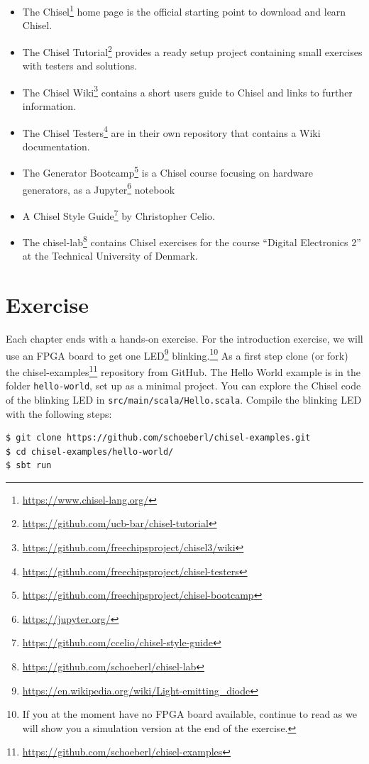 \documentclass[%
    10pt,
    headinclude, footexclude,
    openright, %
    notitlepage,
    cleardoubleempty,
    headsepline,
    pointlessnumbers,
    bibtotoc, idxtotoc,
    ]{scrbook}
\newcommand{\code}[1]{{\small{\texttt{#1}}}}
\newcommand{\myref}[2]{\href{#1}{#2}}
\renewcommand{\myref}[2]{{#2}{\footnote{\url{#1}}}}
\begin{document}
\begin{itemize}
\item The \myref{https://www.chisel-lang.org/}{Chisel} home page is the official starting point to
download and learn Chisel.
\item The \myref{https://github.com/ucb-bar/chisel-tutorial}{Chisel Tutorial} provides a ready setup
project containing small exercises with testers and solutions.

\item The \myref{https://github.com/freechipsproject/chisel3/wiki}{Chisel Wiki} contains
a short users guide to Chisel and links to further information.
\item The \myref{https://github.com/freechipsproject/chisel-testers}{Chisel Testers} are in
their own repository that contains a Wiki documentation.
\item The \myref{https://github.com/freechipsproject/chisel-bootcamp}{Generator Bootcamp} is
a Chisel course focusing on hardware generators, as a \myref{https://jupyter.org/}{Jupyter} notebook
\item A \myref{https://github.com/ccelio/chisel-style-guide}{Chisel Style Guide} by Christopher Celio.
\item The \myref{https://github.com/schoeberl/chisel-lab}{chisel-lab} contains Chisel exercises for the
course ``Digital Electronics 2'' at the Technical University of Denmark.
\end{itemize}

\section{Exercise}

Each chapter ends with a hands-on exercise. For the introduction exercise, we will use an
FPGA board to get one \myref{https://en.wikipedia.org/wiki/Light-emitting_diode}{LED}
blinking.\footnote{If you at the moment have no FPGA board available, continue to read
as we will show you a simulation version at the end of the exercise.}
As a first step clone (or fork) the \myref{https://github.com/schoeberl/chisel-examples}{chisel-examples}
repository from GitHub.
The Hello World example is in the folder \code{hello-world}, set up as
a minimal project. You can explore the Chisel code of the blinking LED
in \code{src/main/scala/Hello.scala}.
Compile the blinking LED with the following steps:

\begin{verbatim}
$ git clone https://github.com/schoeberl/chisel-examples.git
$ cd chisel-examples/hello-world/
$ sbt run
\end{verbatim}
\end{document}
